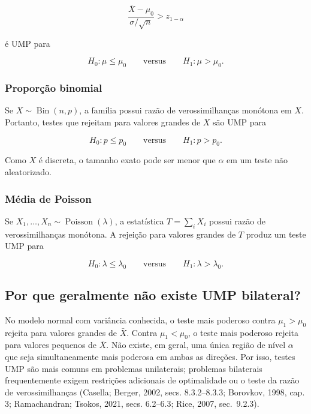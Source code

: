 \documentclass[
  letterpaper,
  DIV=11,
  numbers=noendperiod]{scrreprt}
\begin{document}
\[\frac{\bar{X}-\mu_0}{\sigma/\sqrt{n}}>z_{1-\alpha}\]

é UMP para

\[H_0:\mu\leq\mu_0
\qquad\text{versus}\qquad
H_1:\mu>\mu_0.\]

\subsubsection{Proporção binomial}\label{proporuxe7uxe3o-binomial}

Se \(X\sim\operatorname{Bin}(n,p)\), a família possui razão de
verossimilhanças monótona em \(X\). Portanto, testes que rejeitam para
valores grandes de \(X\) são UMP para

\[H_0:p\leq p_0
\qquad\text{versus}\qquad
H_1:p>p_0.\]

Como \(X\) é discreta, o tamanho exato pode ser menor que \(\alpha\) em
um teste não aleatorizado.

\subsubsection{Média de Poisson}\label{muxe9dia-de-poisson}

Se \(X_1,\ldots,X_n\sim\operatorname{Poisson}(\lambda)\), a estatística
\(T=\sum_iX_i\) possui razão de verossimilhanças monótona. A rejeição
para valores grandes de \(T\) produz um teste UMP para

\[H_0:\lambda\leq\lambda_0
\qquad\text{versus}\qquad
H_1:\lambda>\lambda_0.\]

\subsection{Por que geralmente não existe UMP
bilateral?}\label{por-que-geralmente-nuxe3o-existe-ump-bilateral}

No modelo normal com variância conhecida, o teste mais poderoso contra
\(\mu_1>\mu_0\) rejeita para valores grandes de \(\bar{X}\). Contra
\(\mu_1<\mu_0\), o teste mais poderoso rejeita para valores pequenos de
\(\bar{X}\). Não existe, em geral, uma única região de nível \(\alpha\)
que seja simultaneamente mais poderosa em ambas as direções. Por isso,
testes UMP são mais comuns em problemas unilaterais; problemas
bilaterais frequentemente exigem restrições adicionais de optimalidade
ou o teste da razão de verossimilhanças (Casella; Berger, 2002, secs.
8.3.2--8.3.3; Borovkov, 1998, cap. 3; Ramachandran; Tsokos, 2021, secs.
6.2--6.3; Rice, 2007, sec.~9.2.3).
\end{document}
